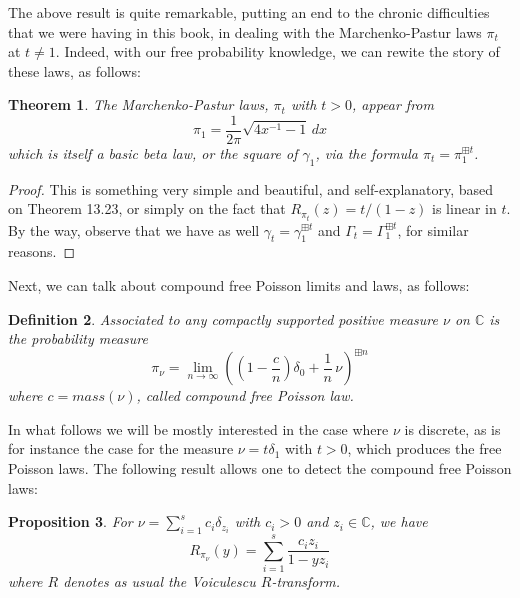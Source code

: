 \documentclass[12pt]{amsbook}
\newtheorem{theorem}{Theorem}[chapter]
\newtheorem{definition}[theorem]{Definition}
\newtheorem{proposition}[theorem]{Proposition}
\begin{document}
The above result is quite remarkable, putting an end to the chronic difficulties that we were having in this book, in dealing with the Marchenko-Pastur laws $\pi_t$ at $t\neq1$. Indeed, with our free probability knowledge, we can rewite the story of these laws, as follows:

\begin{theorem}
The Marchenko-Pastur laws, $\pi_t$ with $t>0$, appear from
$$\pi_1=\frac{1}{2\pi}\sqrt{4x^{-1}-1}\,dx$$
which is itself a basic beta law, or the square of $\gamma_1$, via the formula $\pi_t=\pi_1^{\boxplus t}$.
\end{theorem}

\begin{proof}
This is something very simple and beautiful, and self-explanatory, based on Theorem 13.23, or simply on the fact that $R_{\pi_t}(z)=t/(1-z)$ is linear in $t$. By the way, observe that we have as well $\gamma_t=\gamma_1^{\boxplus t}$ and $\Gamma_t=\Gamma_1^{\boxplus t}$, for similar reasons.
\end{proof}

Next, we can talk about compound free Poisson limits and laws, as follows:


\begin{definition}
Associated to any compactly supported positive measure $\nu$ on $\mathbb C$ is the probability measure
$$\pi_\nu=\lim_{n\to\infty}\left(\left(1-\frac{c}{n}\right)\delta_0+\frac{1}{n}\,\nu\right)^{\boxplus n}$$
where $c=mass(\nu)$, called compound free Poisson law.
\end{definition}

In what follows we will be mostly interested in the case where $\nu$ is discrete, as is for instance the case for the measure $\nu=t\delta_1$ with $t>0$, which produces the free Poisson laws. The following result allows one to detect the compound free Poisson laws:


\begin{proposition}
For $\nu=\sum_{i=1}^sc_i\delta_{z_i}$ with $c_i>0$ and $z_i\in\mathbb C$, we have
$$R_{\pi_\nu}(y)=\sum_{i=1}^s\frac{c_iz_i}{1-yz_i}$$
where $R$ denotes as usual the Voiculescu $R$-transform.
\end{proposition}
\end{document}
